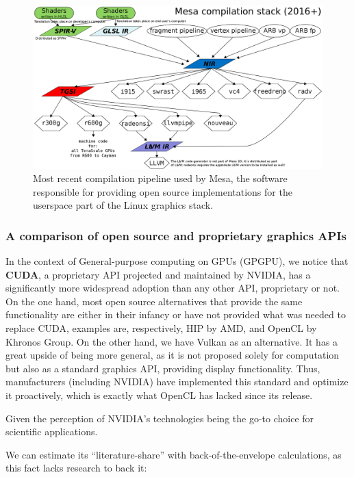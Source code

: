 \documentclass[11pt, conference, onecolumn, final]{IEEEtran}
\begin{document}
\begin{figure}[H]
    \centering
    \includegraphics[width=0.8\linewidth]{mesa.png}
    \caption{Most recent compilation pipeline used by Mesa, the software
        responsible for providing open source implementations for the userspace
        part of the Linux graphics stack.}
    \label{fig:mesa-cs}
    \end{figure}

\subsubsection{A comparison of open source and proprietary graphics APIs} \label{sec:proposal:gapis-comparison}


In the context of General-purpose computing on GPUs (GPGPU), we notice that
\textbf{CUDA}, a proprietary API projected and maintained by NVIDIA, has a
significantly more widespread adoption than any other API, proprietary or not.
On the one hand, most open source alternatives that provide the same
functionality are either in their infancy or have not provided what was needed
to replace CUDA, examples are, respectively, HIP by AMD, and OpenCL by Khronos
Group.
On the other hand, we have Vulkan as an alternative. It has a great upside of
being more general, as it is not proposed solely for computation but also as a
standard graphics API, providing display functionality.
Thus, manufacturers (including NVIDIA) have implemented this standard and
optimize it proactively, which is exactly what OpenCL has lacked since its
release.

Given the perception of NVIDIA's technologies being the go-to choice for
scientific applications.

We can estimate its ``literature-share'' with back-of-the-envelope calculations, as
this fact lacks research to back it:
\end{document}
